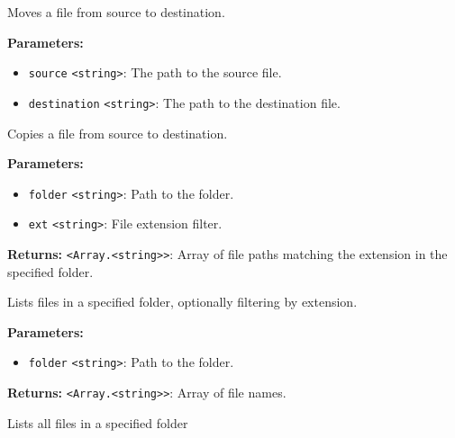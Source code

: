 \documentclass[12pt,a4paper]{article}
\begin{document}
\noindent Moves a file from source to destination.

\vspace{5mm}
\noindent {}


\noindent \textbf{Parameters:}
\begin{itemize}
  \item \texttt{source} \texttt{<string>}: The path to the source file.
  \item \texttt{destination} \texttt{<string>}: The path to the destination file.
\end{itemize}

\noindent Copies a file from source to destination.

\vspace{5mm}
\noindent {}


\noindent \textbf{Parameters:}
\begin{itemize}
  \item \texttt{folder} \texttt{<string>}: Path to the folder.
  \item \texttt{ext} \texttt{<string>}: File extension filter.
\end{itemize}

\noindent \textbf{Returns:} \texttt{<Array.<string>>}: Array of file paths matching the extension in the specified folder.

\noindent Lists files in a specified folder, optionally filtering by extension.

\vspace{5mm}
\noindent {}


\noindent \textbf{Parameters:}
\begin{itemize}
  \item \texttt{folder} \texttt{<string>}: Path to the folder.
\end{itemize}

\noindent \textbf{Returns:} \texttt{<Array.<string>>}: Array of file names.

\noindent Lists all files in a specified folder
\end{document}
